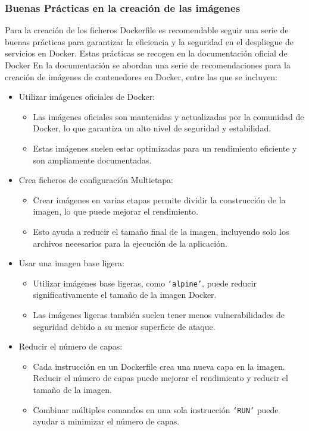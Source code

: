 \documentclass[12pt, a4paper, twoside]{article}
\begin{document}
\subsubsection{Buenas Prácticas en la creación de las imágenes}
Para la creación de los ficheros Dockerfile es recomendable seguir una serie de buenas prácticas para garantizar la eficiencia y la seguridad en el despliegue de servicios en Docker.
Estas prácticas se recogen en la documentación oficial de Docker \cite{dockerfile_best_practices}
En la documentación se abordan una serie de recomendaciones para la creación de imágenes de contenedores en Docker, entre las que se incluyen:
\begin{itemize}
    \item Utilizar imágenes oficiales de Docker:
    \begin{itemize}
        \item Las imágenes oficiales son mantenidas y actualizadas por la comunidad de Docker, lo que garantiza un alto nivel de seguridad y estabilidad.
        \item Estas imágenes suelen estar optimizadas para un rendimiento eficiente y son ampliamente documentadas.
    \end{itemize}
    
    \item Crea ficheros de configuración Multietapa:
    \begin{itemize}
        \item Crear imágenes en varias etapas permite dividir la construcción de la imagen, lo que puede mejorar el rendimiento.
        \item Esto ayuda a reducir el tamaño final de la imagen, incluyendo solo los archivos necesarios para la ejecución de la aplicación.
    \end{itemize}
    
    \item Usar una imagen base ligera:
    \begin{itemize}
        \item Utilizar imágenes base ligeras, como \texttt{`alpine'}, puede reducir significativamente el tamaño de la imagen Docker.
        \item Las imágenes ligeras también suelen tener menos vulnerabilidades de seguridad debido a su menor superficie de ataque.
    \end{itemize}
    
    \item Reducir el número de capas:
    \begin{itemize}
        \item Cada instrucción en un Dockerfile crea una nueva capa en la imagen. Reducir el número de capas puede mejorar el rendimiento y reducir el tamaño de la imagen.
        \item Combinar múltiples comandos en una sola instrucción \texttt{`RUN'} puede ayudar a minimizar el número de capas.
    \end{itemize}
    

\end{itemize}
\end{document}
